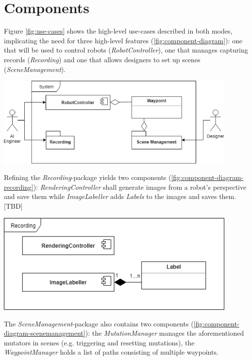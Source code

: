 \section{Components}
Figure \ref{fig:use-cases} shows the high-level use-cases described in both modes, implicating the need for three high-level features (\ref{fig:component-diagram}): one that will be used to control robots (\textit{RobotController}), one that manages capturing records (\textit{Recording}) and one that allows designers to set up scenes (\textit{SceneManagement}).

\begin{center}
\noindent\includegraphics[width=12cm]{tex/img/ch04/ComponentDiagram01.png}
\label{fig:component-diagram}
\end{center}

Refining the \textit{Recording}-package yields two components (\ref{fig:component-diagram-recording}): \textit{RenderingController} shall generate images from a robot's perspective and save them while \textit{ImageLabeller} adds \textit{Labels} to the images and saves them. [TBD]

\begin{center}
\noindent\includegraphics[width=12cm]{tex/img/ch04/ComponentDiagram_Recording03.png}
\label{fig:component-diagram-recording}
\end{center}

The \textit{SceneManagement}-package also contains two components (\ref{fig:component-diagram-scenemanagement}): the \textit{MutationManager} manages the aforementioned mutators in scenes (e.g. triggering and resetting mutations), the \textit{WaypointManager} holds a list of paths consisting of multiple waypoints.

